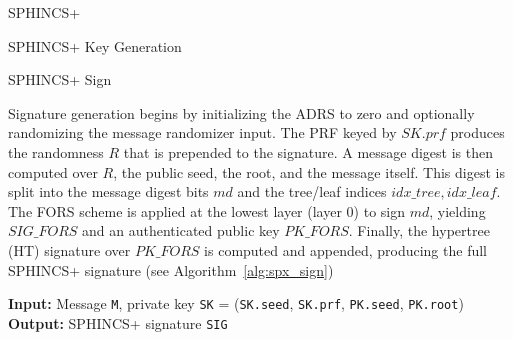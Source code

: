 \documentclass[version=preprint]{iacrcc}
\begin{document}
\begin{section}{SPHINCS+}
\begin{subsection}{SPHINCS+ Key Generation}
\end{subsection}

\begin{subsection}{SPHINCS+ Sign}

Signature generation begins by initializing the ADRS to zero and optionally randomizing the message randomizer input. The PRF keyed by \(\mathit{SK}.\mathit{prf}\) produces the randomness \(R\) that is prepended to the signature. A message digest is then computed over \(R\), the public seed, the root, and the message itself. This digest is split into the message digest bits \(\mathit{md}\) and the tree/leaf indices \(\mathit{idx\_tree},\mathit{idx\_leaf}\). The FORS scheme is applied at the lowest layer (layer 0) to sign \(\mathit{md}\), yielding \(\mathit{SIG\_FORS}\) and an authenticated public key \(\mathit{PK\_FORS}\). Finally, the hypertree (HT) signature over \(\mathit{PK\_FORS}\) is computed and appended, producing the full SPHINCS+ signature (see Algorithm~\ref{alg:spx_sign})

\begin{algorithm}
    \caption{spx\_sign -- Generating a SPHINCS+ signature}
    \label{alg:spx_sign}
    \textbf{Input:} Message \texttt{M}, private key \texttt{SK} = (\texttt{SK.seed}, \texttt{SK.prf}, \texttt{PK.seed}, \texttt{PK.root}) \\
    \textbf{Output:} SPHINCS+ signature \texttt{SIG}

    \vspace{0.2cm}


\end{algorithm}
\end{subsection}
\end{section}
\end{document}
